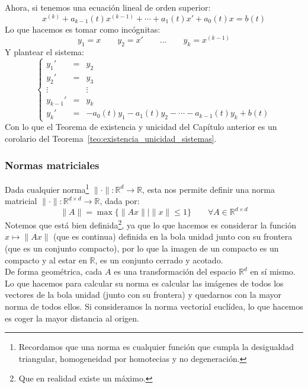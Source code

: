 \begin{coro}
Ahora, si tenemos una ecuación lineal de orden superior:
\begin{equation*}
    x^{(k)} + a_{k-1}(t) x^{(k-1)} + \cdots + a_1(t)x' + a_0(t)x = b(t)
\end{equation*}
Lo que hacemos es tomar como incógnitas:
\begin{equation*}
    y_1 = x \qquad y_2 = x' \qquad \ldots \qquad y_k = x^{(k-1)}
\end{equation*}
Y plantear el sistema:
\begin{equation*}
    \left\{\begin{array}{rcl}
            y_1' &=& y_2 \\
            y_2' &=& y_3 \\
            \vdots && \vdots \\
            y_{k-1}' &=& y_k \\
            y_k' &=& -a_0(t)y_1 -a_1(t) y_2 - \cdots - a_{k-1}(t)y_k + b(t)
    \end{array}\right.
\end{equation*}
Con lo que el Teorema de existencia y unicidad del Capítulo anterior es un corolario del Teorema~\ref{teo:existencia_unicidad_sistemas}.
\end{coro}

\subsubsection{Normas matriciales}
Dada cualquier norma\footnote{Recordamos que una norma es cualquier función que cumpla la desigualdad triangular, homogeneidad por homotecias y no degeneración.} $\|\cdot \|:\mathbb{R}^d\rightarrow\mathbb{R}$, esta nos permite definir una norma matricial $\|\cdot \|:\mathbb{R}^{d\times d}\rightarrow\mathbb{R}$, dada por:
\begin{equation*}
    \|A\| = \max\{\|Ax\| \mid \|x\|\leq 1\} \qquad \forall A\in \mathbb{R}^{d\times d}
\end{equation*}
Notemos que está bien definida\footnote{Que en realidad existe un máximo.}, ya que lo que hacemos es considerar la función $x\longmapsto \|Ax\|$ (que es continua) definida en la bola unidad junto con su frontera (que es un conjunto compacto), por lo que la imagen de un compacto es un compacto y al estar en $\mathbb{R}$, es un conjunto cerrado y acotado.\\

De forma geométrica, cada $A$ es una transformación del espacio $\mathbb{R}^d$ en sí mismo. Lo que hacemos para calcular su norma es calcular las imágenes de todos los vectores de la bola unidad (junto con su frontera) y quedarnos con la mayor norma de todos ellos. Si consideramos la norma vectorial euclídea, lo que hacemos es coger la mayor distancia al origen.

